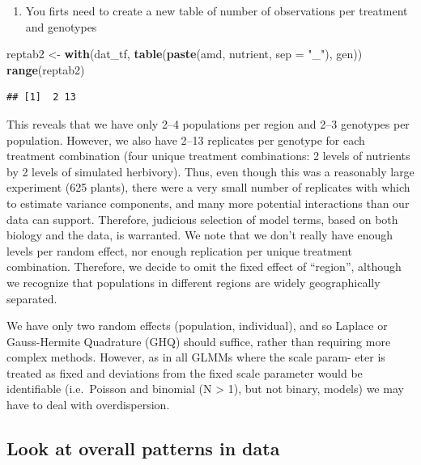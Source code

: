\documentclass[
  12pt,
]{book}
\newenvironment{Shaded}{\begin{snugshade}}{\end{snugshade}}
\newcommand{\DataTypeTok}[1]{\textcolor[rgb]{0.13,0.29,0.53}{#1}}
\newcommand{\KeywordTok}[1]{\textcolor[rgb]{0.13,0.29,0.53}{\textbf{#1}}}
\newcommand{\NormalTok}[1]{#1}
\newcommand{\StringTok}[1]{\textcolor[rgb]{0.31,0.60,0.02}{#1}}
\providecommand{\tightlist}{%
  \setlength{\itemsep}{0pt}\setlength{\parskip}{0pt}}
\begin{document}
\begin{enumerate}
\def\labelenumi{\arabic{enumi}.}
\setcounter{enumi}{2}
\tightlist
\item
  You firts need to create a new table of number of observations per treatment and genotypes
\end{enumerate}

\begin{Shaded}
\begin{Highlighting}[]
\NormalTok{reptab2 <-}\StringTok{ }\KeywordTok{with}\NormalTok{(dat_tf, }\KeywordTok{table}\NormalTok{(}\KeywordTok{paste}\NormalTok{(amd, nutrient, }\DataTypeTok{sep =} \StringTok{"_"}\NormalTok{), gen))}
\KeywordTok{range}\NormalTok{(reptab2)}
\end{Highlighting}
\end{Shaded}

\begin{verbatim}
## [1]  2 13
\end{verbatim}

This reveals that we have only 2--4 populations per region and 2--3 genotypes per population. However, we also have 2--13 replicates per genotype for each treatment combination (four unique treatment combinations: 2 levels of nutrients by 2 levels of simulated herbivory). Thus, even though this was a reasonably large experiment (625 plants), there were a very small number of replicates with which to estimate variance components, and many more potential interactions than our data can support. Therefore, judicious selection of model terms, based on both biology and the data, is warranted. We note that we don't really have enough levels per random effect, nor enough replication per unique treatment combination. Therefore, we decide to omit the fixed effect of ``region'', although we recognize that populations in different regions are widely geographically separated.

We have only two random effects (population, individual), and so Laplace or Gauss-Hermite Quadrature (GHQ) should suffice, rather than requiring more complex methods. However, as in all GLMMs where the scale param- eter is treated as fixed and deviations from the fixed scale parameter would be identifiable (i.e.~Poisson and binomial (N \textgreater{} 1), but not binary, models) we may have to deal with overdispersion.

\hypertarget{look-at-overall-patterns-in-data}{%
\subsection{Look at overall patterns in data}\label{look-at-overall-patterns-in-data}}
\end{document}
